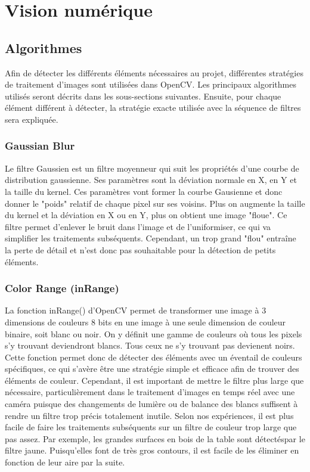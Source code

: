 \chapter{Vision numérique}

\section{Algorithmes}

Afin de détecter les différents éléments nécessaires au projet, différentes stratégies de traitement d'images sont utilisées dans OpenCV. Les principaux algorithmes utilisés seront décrits dans les sous-sections suivantes. Ensuite, pour chaque élément différent à détecter, la stratégie exacte utilisée avec la séquence de filtres sera expliquée.

\subsection{Gaussian Blur}

Le filtre Gaussien est un filtre moyenneur qui suit les propriétés d'une courbe de distribution gaussienne. Ses paramètres sont la déviation normale en X, en Y et la taille du kernel. Ces paramètres vont former la courbe Gausienne et donc donner le "poids" relatif de chaque pixel sur ses voisins. Plus on augmente la taille du kernel et la déviation en X ou en Y, plus on obtient une image "floue". Ce filtre permet d'enlever le bruit dans l'image et de l'uniformiser, ce qui va simplifier les traitements subséquents. Cependant, un trop grand "flou" entraîne la perte de détail et n'est donc pas souhaitable pour la détection de petits éléments.

\subsection{Color Range (inRange)}

La fonction inRange() d'OpenCV permet de transformer une image à 3 dimensions de couleurs 8 bits en une image à une seule dimension de couleur binaire, soit blanc ou noir. On y définit une gamme de couleurs où tous les pixels s'y trouvant deviendront blancs. Tous ceux ne s'y trouvant pas devienent noirs. Cette fonction permet donc de détecter des éléments avec un éventail de couleurs spécifiques, ce qui s'avère être une stratégie simple et efficace afin de trouver des éléments de couleur. Cependant, il est important de mettre le filtre plus large que nécessaire, particulièrement dans le traitement d'images en temps réel avec une caméra puisque des changements de lumière ou de balance des blancs suffisent à rendre un filtre trop précis totalement inutile. Selon nos expériences, il est plus facile de faire les traitements subséquents sur un filtre de couleur trop large que pas assez. Par exemple, les grandes surfaces en bois de la table sont détectéspar le filtre jaune. Puisqu'elles font de très gros contours, il est facile de les éliminer en fonction de leur aire par la suite.



